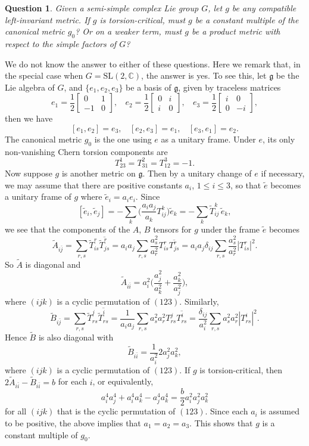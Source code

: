 \documentclass{amsart}
\newtheorem{question}[theorem]{Question}
\begin{document}
{\begin{question}
Given a semi-simple complex Lie group $G$, let $g$ be any compatible left-invariant metric. If $g$ is torsion-critical, must $g$ be a constant multiple of the canonical metric $g_0$? Or on a weaker term, must $g$ be a product metric with respect to the simple factors of $G$?
\end{question}

We do not know the answer to either of these questions. Here we remark that, in the special case when $G=\mbox{SL}(2,{\mathbb C})$, the answer is yes. To see this, let ${\mathfrak g}$ be the Lie algebra of $G$, and $\{ e_1, e_2, e_3\}$ be a basis of ${\mathfrak g}$, given by traceless matrices
$$ e_1= \frac{1}{2} \left[ \begin{array}{cc} 0 & 1 \\ -1 & 0 \end{array} \right] , \ \ \ \ e_2= \frac{1}{2} \left[ \begin{array}{cc} 0 & i \\ i & 0 \end{array} \right] , \ \ \ \ e_3= \frac{1}{2} \left[ \begin{array}{cc} i & 0 \\ 0 & -i \end{array} \right] , $$
then we have 
$$ [e_1, e_2]=e_3, \ \ \ \ [e_2, e_3]=e_1,\ \ \ \ [e_3, e_1]=e_2. $$
The canonical metric $g_0$ is the one using $e$ as a unitary frame. Under $e$, its only non-vanishing Chern torsion components are $$T^1_{23}=T^2_{31}=T^3_{12} =-1. $$
Now suppose $g$ is another metric on ${\mathfrak g}$. Then by a unitary change of $e$ if necessary, we may assume that there are positive constants $a_i$, $1\leq i\leq 3$, so that $\tilde{e}$ becomes a unitary frame of $g$ where $\tilde{e}_i=a_ie_i$. Since
$$ [\tilde{e}_i, \tilde{e}_j ] = - \sum_k \big( \frac{a_ia_j}{a_k}T^k_{ij} \big) \tilde{e}_k = - \sum_k \tilde{T}^k_{ij}\, \tilde{e}_k , $$
we see that the components of the $A$, $B$ tensors for $g$ under the frame $\tilde{e}$ becomes
$$ \tilde{A}_{i\bar{j}} = \sum_{r,s} \tilde{T}^r_{is}  \overline{ \tilde{T}^r_{js} } = a_ia_j \sum_{r,s} \frac{a_s^2}{a_r^2} T^r_{is}  \overline{ T^r_{js}}= a_ia_j\delta_{ij} \sum_{r,s}\frac{a_s^2}{a_r^2} |T^r_{is}|^2 .$$
So $\tilde{A}$ is diagonal and 
$$ \tilde{A}_{i\bar{i}} = a_i^2 \big( \frac{a_j^2}{a_k^2} + \frac{a_k^2}{a_j^2} \big) , $$
where $(ijk)$ is a cyclic permutation of $(123)$. Similarly,
$$ \tilde{B}_{i\bar{j}} = \sum_{r,s} \tilde{T}^j_{rs}  \overline{ \tilde{T}^i_{rs} } = \frac{1}{a_ia_j} \sum_{r,s} a_s^2a_r^2 T^j_{rs}  \overline{ T^i_{rs}}= \frac{\delta_{ij}}{a_i^2} \sum_{r,s}a_s^2a_r^2 |T^i_{rs}|^2 .$$
Hence $\tilde{B}$ is also diagonal with 
$$ \tilde{B}_{i\bar{i}} = \frac{1}{a_i^2}2 a_j^2a_k^2, $$
where $(ijk)$ is a cyclic permutation of $(123)$. If $g$ is torsion-critical, then $2\tilde{A}_{i\bar{i}}- \tilde{B}_{i\bar{i}} = b$ for each $i$, or equivalently,
$$ a_i^4a_j^4 + a_i^4a_k^4 - a_j^4 a_k^4 = \frac{b}{2}a_i^2a_j^2a_k^2  $$
for all $(ijk)$ that is the cyclic permutation of $(123)$. Since each $a_i$ is assumed to be positive, the above implies that $a_1=a_2=a_3$. This shows that $g$ is a constant multiple of $g_0$. 



}
\end{document}
